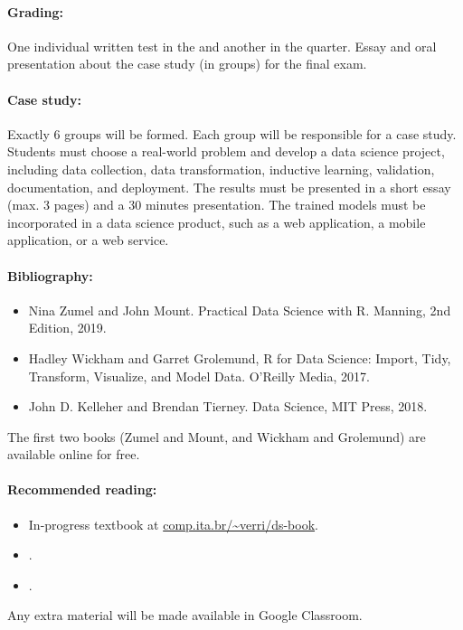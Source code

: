 \paragraph{Grading:} One individual written test in the  and another in the  quarter.
Essay and oral presentation about the case study (in groups) for the final exam.

\paragraph{Case study:} Exactly 6 groups will be formed.  Each group will be responsible for
a case study.  Students must choose a real-world problem and develop a data science
project, including data collection, data transformation, inductive learning, validation,
documentation, and deployment.  The results must be presented in a short essay (max. 3
pages) and a 30 minutes presentation.  The trained models must be incorporated in a data
science product, such as a web application, a mobile application, or a web service.

\thispagestyle{empty}
\paragraph{Bibliography:}
\begin{itemize}
  \item Nina Zumel and John Mount. Practical Data Science with R. Manning, 2nd Edition, 2019.
  \item Hadley Wickham and Garret Grolemund, R for Data Science: Import, Tidy, Transform, Visualize, and Model Data. O’Reilly Media, 2017.
  \item John D. Kelleher and Brendan Tierney. Data Science, MIT Press, 2018.
\end{itemize}

The first two books (Zumel and Mount, and Wickham and Grolemund) are available online for free.

\thispagestyle{empty}
\paragraph{Recommended reading:}
\begin{itemize}
  \item In-progress textbook at \href{https://comp.ita.br/~verri/ds-book}{comp.ita.br/\textasciitilde{}verri/ds-book}.
  \item {}.
  \item {}.
\end{itemize}
Any extra material will be made available in Google Classroom.

